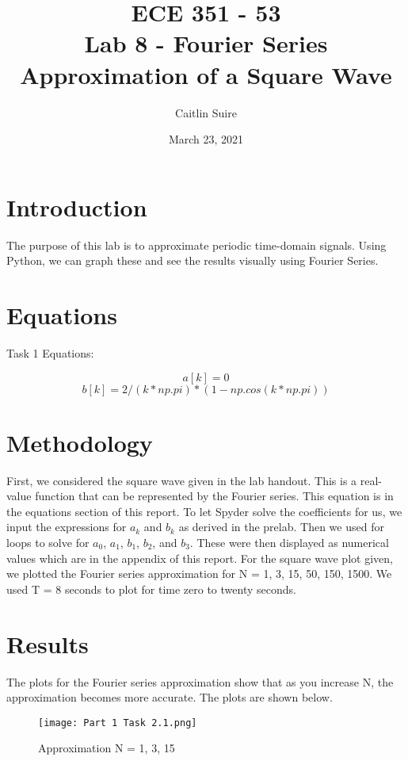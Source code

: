 \documentclass[12pt]{report}
\title{\myfont \textbf{ ECE 351 - 53 \\ \bigskip Lab 8 - Fourier Series Approximation of a Square Wave}}
\author{Caitlin Suire}
\date{March 23, 2021}
\begin{document}
\maketitle

\thispagestyle{empty}

\newpage

\tableofcontents
\pagebreak


\section{Introduction}
The purpose of this lab is to approximate periodic time-domain signals. Using Python, we can graph these and see the results visually using Fourier Series. 

\section{Equations}
Task 1 Equations:

\[a[k] = 0\]
\[b[k] = 2/(k*np.pi)*(1-np.cos(k*np.pi))\] 


\section{Methodology}
First, we considered the square wave given in the lab handout. This is a real-value function that can be represented by the Fourier series. This equation is in the equations section of this report. To let Spyder solve the coefficients for us, we input the expressions for $a_k$ and $b_k$ as derived in the prelab. Then we used for loops to solve for $a_0$, $a_1$, $b_1$, $b_2$, and $b_3$. These were then displayed as numerical values which are in the appendix of this report. For the square wave plot given, we plotted the Fourier series approximation for N = {1, 3, 15, 50, 150, 1500}. We used T = 8 seconds to plot for time zero to twenty seconds.  

\section{Results}
The plots for the Fourier series approximation show that as you increase N, the approximation becomes more accurate. The plots are shown below.

\begin{figure}[ht]
\begin{center}
\texttt{[image: Part 1 Task 2.1.png]}
\caption{Approximation N = 1, 3, 15}
\end{center}
\end{figure}
\end{document}
